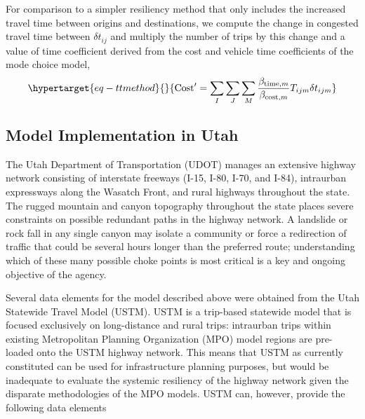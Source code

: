\documentclass[
  letterpaper,
]{trb}
\begin{document}
For comparison to a simpler resiliency method that only includes the
increased travel time between origins and destinations, we compute the
change in congested travel time between \(\delta t_{ij}\) and multiply
the number of trips by this change and a value of time coefficient
derived from the cost and vehicle time coefficients of the mode choice
model, \begin{equation}\protect\hypertarget{eq-ttmethod}{}{
\mathrm{Cost}' =  \sum_I \sum_J \sum_M \frac{\beta_{\mathrm{time}, m} }{\beta_{\mathrm{cost}, m}} T_{ijm} \delta t_{ijm}
}\label{eq-ttmethod}\end{equation}

\hypertarget{model-implementation-in-utah}{%
\subsection{Model Implementation in
Utah}\label{model-implementation-in-utah}}

The Utah Department of Transportation (UDOT) manages an extensive
highway network consisting of interstate freeways (I-15, I-80, I-70, and
I-84), intraurban expressways along the Wasatch Front, and rural
highways throughout the state. The rugged mountain and canyon topography
throughout the state places severe constraints on possible redundant
paths in the highway network. A landslide or rock fall in any single
canyon may isolate a community or force a redirection of traffic that
could be several hours longer than the preferred route; understanding
which of these many possible choke points is most critical is a key and
ongoing objective of the agency.

Several data elements for the model described above were obtained from
the Utah Statewide Travel Model (USTM). USTM is a trip-based statewide
model that is focused exclusively on long-distance and rural trips:
intraurban trips within existing Metropolitan Planning Organization
(MPO) model regions are pre-loaded onto the USTM highway network. This
means that USTM as currently constituted can be used for infrastructure
planning purposes, but would be inadequate to evaluate the systemic
resiliency of the highway network given the disparate methodologies of
the MPO models. USTM can, however, provide the following data elements
\end{document}
